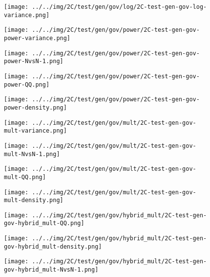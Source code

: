 \begin{figure}[H]
\centering	\texttt{[image: ../../img/2C/test/gen/gov/log/2C-test-gen-gov-log-variance.png]}
\end{figure}
\begin{figure}[H]
\centering	\texttt{[image: ../../img/2C/test/gen/gov/power/2C-test-gen-gov-power-variance.png]}
\end{figure}
\begin{figure}[H]
\centering	\texttt{[image: ../../img/2C/test/gen/gov/power/2C-test-gen-gov-power-NvsN-1.png]}
\end{figure}
\begin{figure}[H]
\centering	\texttt{[image: ../../img/2C/test/gen/gov/power/2C-test-gen-gov-power-QQ.png]}
\end{figure}
\begin{figure}[H]
\centering	\texttt{[image: ../../img/2C/test/gen/gov/power/2C-test-gen-gov-power-density.png]}
\end{figure}
\begin{figure}[H]
\centering	\texttt{[image: ../../img/2C/test/gen/gov/mult/2C-test-gen-gov-mult-variance.png]}
\end{figure}
\begin{figure}[H]
\centering	\texttt{[image: ../../img/2C/test/gen/gov/mult/2C-test-gen-gov-mult-NvsN-1.png]}
\end{figure}
\begin{figure}[H]
\centering	\texttt{[image: ../../img/2C/test/gen/gov/mult/2C-test-gen-gov-mult-QQ.png]}
\end{figure}
\begin{figure}[H]
\centering	\texttt{[image: ../../img/2C/test/gen/gov/mult/2C-test-gen-gov-mult-density.png]}
\end{figure}
\begin{figure}[H]
\centering	\texttt{[image: ../../img/2C/test/gen/gov/hybrid\_mult/2C-test-gen-gov-hybrid\_mult-QQ.png]}
\end{figure}
\begin{figure}[H]
\centering	\texttt{[image: ../../img/2C/test/gen/gov/hybrid\_mult/2C-test-gen-gov-hybrid\_mult-density.png]}
\end{figure}
\begin{figure}[H]
\centering	\texttt{[image: ../../img/2C/test/gen/gov/hybrid\_mult/2C-test-gen-gov-hybrid\_mult-NvsN-1.png]}
\end{figure}

